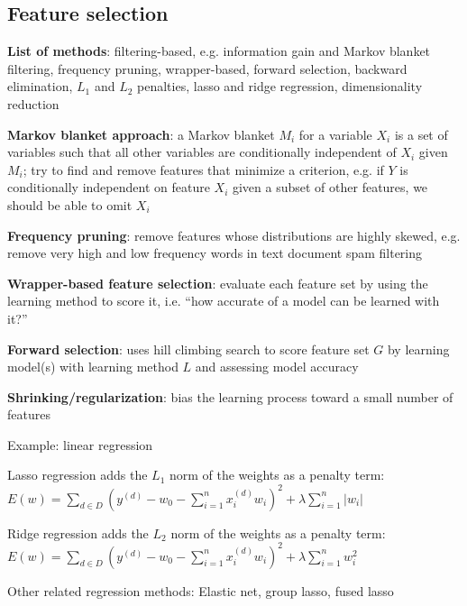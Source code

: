 \documentclass[letterpaper,fontsize=5pt]{scrartcl}
\renewenvironment{enumerate}[1]{\begin{compactenum}#1}{\end{compactenum}}
\theoremstyle{definition}
\newcommand{\abs}[1]{\lvert#1\rvert}
\begin{document}
\begin{multicols}{2}
\section{Feature selection}
	\begin{enumerate}
		\item \textbf{List of methods}: filtering-based, e.g. information gain and Markov blanket filtering, frequency pruning, wrapper-based, forward selection, backward elimination, $L_1$ and $L_2$ penalties, lasso and ridge regression, dimensionality reduction
		\item \textbf{Markov blanket approach}: a Markov blanket $M_i$ for a variable $X_i$ is a set of variables such that all other variables are conditionally independent of $X_i$ given $M_i$; try to find and remove features that minimize a criterion, e.g. if $Y$ is conditionally independent on feature $X_i$ given a subset of other features, we should be able to omit $X_i$
		\item \textbf{Frequency pruning}: remove features whose distributions are highly skewed, e.g. remove very high and low frequency words in text document spam filtering
		\item \textbf{Wrapper-based feature selection}: evaluate each feature set by using the learning method to score it, i.e. ``how accurate of a model can be learned with it?''
		\item \textbf{Forward selection}: uses hill climbing search to score feature set $G$ by learning model(s) with learning method $L$ and assessing model accuracy
		\item \textbf{Shrinking/regularization}: bias the learning process toward a small number of features
			\begin{enumerate}
				\item Example: linear regression
					\begin{enumerate}
						\item Lasso regression adds the $L_1$ norm of the weights as a penalty term: $E(w) = \sum\limits_{d\in D} (y^{(d)} - w_0 - \sum\limits_{i=1}^n x_i^{(d)} w_i)^2 + \lambda \sum\limits_{i=1}^n \abs{w_i} $
						\item Ridge regression adds the $L_2$ norm of the weights as a penalty term: $E(w) = \sum\limits_{d\in D} (y^{(d)} - w_0 - \sum\limits_{i=1}^n x_i^{(d)} w_i)^2 + \lambda \sum\limits_{i=1}^n w_i^2 $
						\item Other related regression methods: Elastic net, group lasso, fused lasso
					\end{enumerate}
			\end{enumerate}
	\end{enumerate}

\end{multicols}
\end{document}
